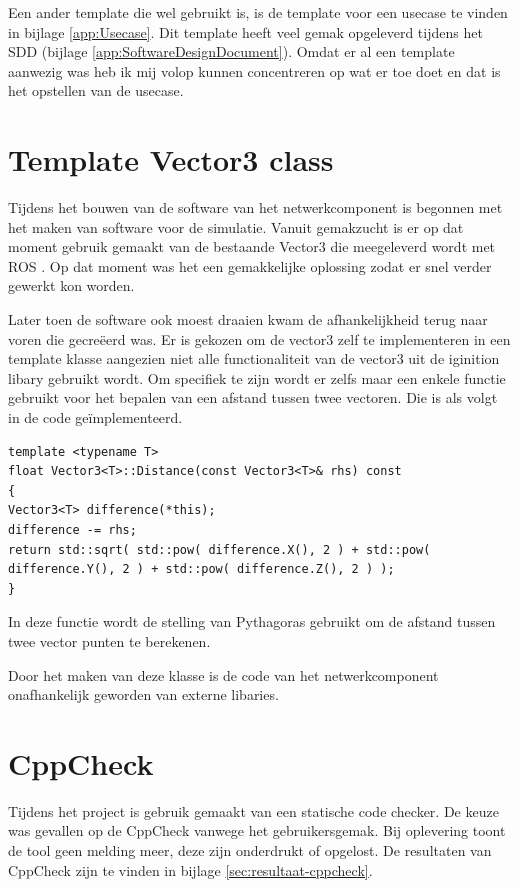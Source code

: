 \documentclass[a4paper, 11pt, oneside]{report}
\begin{document}
Een ander template die wel gebruikt is, is de template voor een usecase te vinden in bijlage \ref{app:Usecase}.
Dit template heeft veel gemak opgeleverd tijdens het SDD (bijlage \ref{app:SoftwareDesignDocument}). 
Omdat er al een template aanwezig was heb ik mij volop kunnen concentreren op wat er toe doet en dat is het opstellen van de usecase. 



\section{Template Vector3 class}

Tijdens het bouwen van de software van het netwerkcomponent is begonnen met het maken van software voor de simulatie.
Vanuit gemakzucht is er op dat moment gebruik gemaakt van de bestaande Vector3 die meegeleverd wordt met ROS \cite{ignitionVector}.
Op dat moment was het een gemakkelijke oplossing zodat er snel verder gewerkt kon worden. 

Later toen de software ook moest draaien kwam de afhankelijkheid terug naar voren die gecreëerd was.
Er is gekozen om de vector3 zelf te implementeren in een template klasse aangezien niet alle functionaliteit van de vector3 uit de iginition libary\cite{ignitionVector} gebruikt wordt.
Om specifiek te zijn wordt er zelfs maar een enkele functie gebruikt voor het bepalen van een afstand tussen twee vectoren.
Die is als volgt in de code geïmplementeerd. 

\begin{lstlisting}
template <typename T>
float Vector3<T>::Distance(const Vector3<T>& rhs) const
{
Vector3<T> difference(*this);
difference -= rhs;
return std::sqrt( std::pow( difference.X(), 2 ) + std::pow( difference.Y(), 2 ) + std::pow( difference.Z(), 2 ) );
}
\end{lstlisting}

In deze functie wordt de stelling van Pythagoras gebruikt om de afstand tussen twee vector punten te berekenen.

Door het maken van deze klasse is de code van het netwerkcomponent onafhankelijk geworden van externe libaries.

\section{CppCheck}
Tijdens het project is gebruik gemaakt van een statische code checker.
De keuze was gevallen op de CppCheck vanwege het gebruikersgemak.
Bij oplevering toont de tool geen melding meer, deze zijn onderdrukt of opgelost.
De resultaten van CppCheck zijn te vinden in bijlage \ref{sec:resultaat-cppcheck}.
\end{document}
